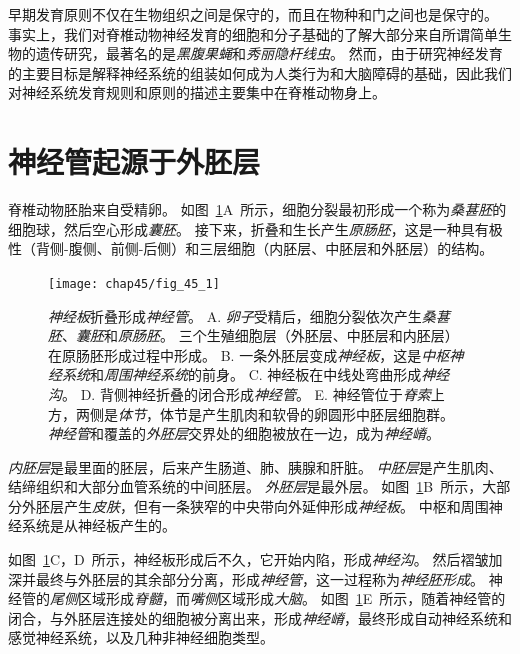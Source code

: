 早期发育原则不仅在生物组织之间是保守的，而且在物种和门之间也是保守的。
事实上，我们对脊椎动物神经发育的细胞和分子基础的了解大部分来自所谓简单生物的遗传研究，最著名的是\textit{黑腹果蝇}和\textit{秀丽隐杆线虫}。
然而，由于研究神经发育的主要目标是解释神经系统的组装如何成为人类行为和大脑障碍的基础，因此我们对神经系统发育规则和原则的描述主要集中在脊椎动物身上。



\section{神经管起源于外胚层}

脊椎动物胚胎来自受精卵。
如图~\ref{fig:45_1}A~所示，细胞分裂最初形成一个称为\textit{桑葚胚}的细胞球，然后空心形成\textit{囊胚}。
接下来，折叠和生长产生\textit{原肠胚}，这是一种具有极性（背侧-腹侧、前侧-后侧）和三层细胞（内胚层、中胚层和外胚层）的结构。


\begin{figure}[htbp]
	\centering
	\texttt{[image: chap45/fig\_45\_1]}
	\caption{\textit{神经板}折叠形成\textit{神经管}。
		A. \textit{卵子}受精后，细胞分裂依次产生\textit{桑葚胚}、\textit{囊胚}和\textit{原肠胚}。
		三个生殖细胞层（外胚层、中胚层和内胚层）在原肠胚形成过程中形成。
		B. 一条外胚层变成\textit{神经板}，这是\textit{中枢神经系统}和\textit{周围神经系统}的前身。
		C. 神经板在中线处弯曲形成\textit{神经沟}。
		D. 背侧神经折叠的闭合形成\textit{神经管}。
		E. 神经管位于\textit{脊索}上方，两侧是\textit{体节}，体节是产生肌肉和软骨的卵圆形中胚层细胞群。
		\textit{神经管}和覆盖的\textit{外胚层}交界处的细胞被放在一边，成为\textit{神经嵴}。}
	\label{fig:45_1}
\end{figure}


\textit{内胚层}是最里面的胚层，后来产生肠道、肺、胰腺和肝脏。
\textit{中胚层}是产生肌肉、结缔组织和大部分血管系统的中间胚层。
\textit{外胚层}是最外层。
如图~\ref{fig:45_1}B~所示，大部分外胚层产生\textit{皮肤}，但有一条狭窄的中央带向外延伸形成\textit{神经板}。
中枢和周围神经系统是从神经板产生的。


如图~\ref{fig:45_1}C，D~所示，神经板形成后不久，它开始内陷，形成\textit{神经沟}。
然后褶皱加深并最终与外胚层的其余部分分离，形成\textit{神经管}，这一过程称为\textit{神经胚形成}。
神经管的\textit{尾侧}区域形成\textit{脊髓}，而\textit{嘴侧}区域形成\textit{大脑}。
如图~\ref{fig:45_1}E~所示，随着神经管的闭合，与外胚层连接处的细胞被分离出来，形成\textit{神经嵴}，最终形成自动神经系统和感觉神经系统，以及几种非神经细胞类型。



